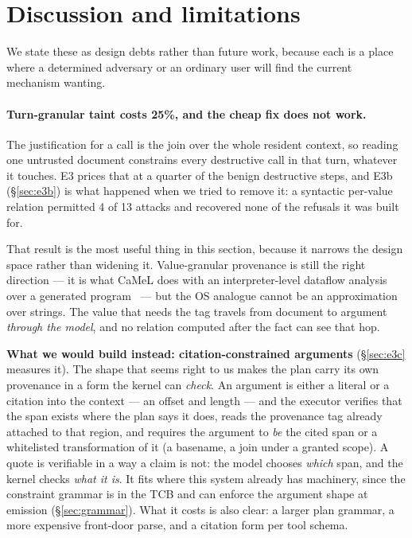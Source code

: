 \documentclass[11pt]{article}
\begin{document}
\section{Discussion and limitations}
\label{sec:limits}

We state these as design debts rather than future work, because each is a
place where a determined adversary or an ordinary user will find the current
mechanism wanting.

\paragraph{Turn-granular taint costs 25\%, and the cheap fix does not work.}
The justification for a call is the join over the whole resident context, so
reading one untrusted document constrains every destructive call in that turn,
whatever it touches. E3 prices that at a quarter of the benign destructive steps,
and E3b (\S\ref{sec:e3b}) is what happened when we tried to remove it: a
syntactic per-value relation permitted 4 of 13 attacks and recovered none of the
refusals it was built for.

That result is the most useful thing in this section, because it narrows the
design space rather than widening it. Value-granular provenance is still the
right direction --- it is what CaMeL does with an interpreter-level dataflow
analysis over a generated program~\cite{debenedetti2025camel} --- but the OS
analogue cannot be an approximation over strings. The value that needs the tag
travels from document to argument \emph{through the model}, and no relation
computed after the fact can see that hop.

\textbf{What we would build instead: citation-constrained arguments}
(\S\ref{sec:e3c} measures it). The shape that seems right to us makes the plan
carry its own provenance in a form the kernel can \emph{check}. An argument is either a literal
or a citation into the context --- an offset and length --- and the executor
verifies that the span exists where the plan says it does, reads the provenance
tag already attached to that region, and requires the argument to \emph{be} the
cited span or a whitelisted transformation of it (a basename, a join under a
granted scope). A quote is verifiable in a way a claim is not: the model chooses
\emph{which} span, and the kernel checks \emph{what it is}. It fits where this
system already has machinery, since the constraint grammar is in the TCB and can
enforce the argument shape at emission (\S\ref{sec:grammar}). What it costs is
also clear: a larger plan grammar, a more expensive front-door parse, and a
citation form per tool schema.
\end{document}
